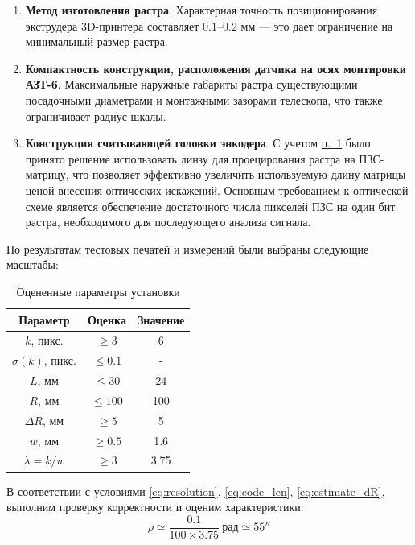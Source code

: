 \begin{enumerate}
    \item \textbf{Метод изготовления растра}\label{point_raster}. Характерная точность позиционирования экструдера 3D-принтера составляет $0.1$--$0.2$ мм --- это дает ограничение на минимальный размер растра.
    \item \textbf{Компактность конструкции, расположения датчика на осях монтировки АЗТ-6}. Максимальные наружные габариты растра существующими посадочными диаметрами и монтажными зазорами телескопа, что также ограничивает радиус шкалы.
    \item \textbf{Конструкция считывающей головки энкодера}\label{point_lense_distortion}. С учетом \hyperref[point_raster]{п.~1} было принято решение использовать линзу для проецирования растра на ПЗС-матрицу, что позволяет эффективно увеличить используемую длину матрицы ценой внесения оптических искажений. Основным требованием к оптической схеме является обеспечение достаточного числа пикселей ПЗС на один бит растра, необходимого для последующего анализа сигнала.
\end{enumerate}

По результатам тестовых печатей и измерений были выбраны следующие масштабы:
\begin{table}[H]
    \centering
    \begin{tabular}{|c|c|c|}
        \hline
        Параметр & Оценка & Значение \\
        \hline
        $k$, пикс. & $\geq 3$ & 6\\
        $\sigma(k)$, пикс. & $\leq 0.1$ & -\\
        $L$, мм & $\leq 30$& 24\\
        $R$, мм & $\leq 100$ & 100\\
        $\Delta R$, мм & $\geq5$ & 5\\
        $w$, мм & $\geq 0.5$ & 1.6\\
        $\lambda = k/w$ & $\geq 3$ & 3.75\\
        \hline
    \end{tabular}
    \caption{Оцененные параметры установки}
    \label{tab:work_values}
\end{table}

В соответствии с условиями \eqref{eq:resolution}, \eqref{eq:code_len}, \eqref{eq:estimate_dR}, выполним проверку корректности и оценим характеристики:
\begin{equation*}
    \rho \simeq \frac{0.1}{100\times3.75}~\mathrm{рад} \simeq 55'' 
\end{equation*}

